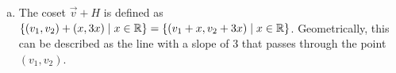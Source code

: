 \documentclass[11pt]{scrartcl}
\theoremstyle{dotlessP}
\theoremstyle{dotlessN}
\DeclarePairedDelimiter\set{\{}{\}}
\newcommand{\reals}{\mathbb{R}} %
\begin{document}
\begin{enumerate}[(a)]
\begin{proof}
	\begin{subproof}
		[Subproof]
		Suppose $\vec{v_1} - \vec{v_2} \in H$. From the previous proof, it is sufficient to prove that $\vec{v_1} \in \vec{v_2} + H$ to show that $\vec{v_1} + H = \vec{v_2} + H$. Let $\vec{v_1} - \vec{v_2} = w \in H$. Then $\vec{v_1} = \vec{v_2} + w$, $w \in H$. Thus, $\vec{v_1} \in \vec{v_2} + H$, as desired.
	\end{subproof}
	As we have proved both directions of the biconditional statement, the proof is complete.
\end{proof}
\item The coset $\vec{v} + H$ is defined as $\set*{(v_1, v_2) + (x, 3x) \mid x \in \reals} = \set*{(v_1 + x, v_2 + 3x) \mid x \in \reals}$. Geometrically, this can be described as the line with a slope of 3 that passes through the point $(v_1, v_2)$.
\end{enumerate}
\end{document}
